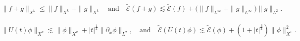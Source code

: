 \documentclass[10pt,a4paper]{amsart}
\begin{document}
\begin{equation}\label{est:Ekf+g}
\begin{aligned}
\| f+g\|_{X^k}\leq \| f\|_{X^k}+\| g\|_{X^k} \quad \text{and} \quad
\widetilde{\mathcal{E}}(f+g)\lesssim \widetilde{\mathcal{E}}(f)+\big( \| f\|_{L^\infty}+\| g\|_{L^\infty}\big) \| g\|_{L^2}.
\end{aligned}
\end{equation}

\begin{equation}\label{est:UtEk}
\begin{aligned}  
\| U(t)\phi\|_{X^k}{}\lesssim \| \phi\|_{X^k}+|t|^{\frac14}\| \partial_x\phi\|_{L^2}, \quad \text{and}\quad
\widetilde{\mathcal{E}}(U(t)\phi){}\lesssim \widetilde{\mathcal{E}}(\phi)+(1+|t|^{\frac34})\| \phi\|_{X^1}^2.
\end{aligned} 
\end{equation}
\end{document}
